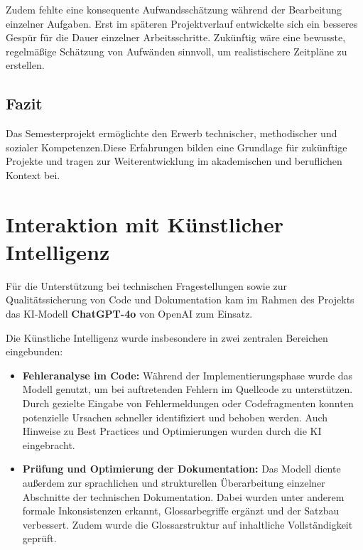 \documentclass[a4paper,12pt]{article}
\begin{document}
Zudem fehlte eine konsequente Aufwandsschätzung während der Bearbeitung einzelner Aufgaben. Erst im späteren Projektverlauf entwickelte sich ein besseres Gespür für die Dauer einzelner Arbeitsschritte. Zukünftig wäre eine bewusste, regelmäßige Schätzung von Aufwänden sinnvoll, um realistischere Zeitpläne zu erstellen.


\subsection{Fazit}

Das Semesterprojekt ermöglichte den Erwerb technischer, methodischer und sozialer Kompetenzen.Diese Erfahrungen bilden eine Grundlage für zukünftige Projekte und tragen zur Weiterentwicklung im akademischen und beruflichen Kontext bei.

\newpage


\section{Interaktion mit Künstlicher Intelligenz}

Für die Unterstützung bei technischen Fragestellungen sowie zur Qualitätssicherung von Code und Dokumentation kam im Rahmen des Projekts das KI-Modell \textbf{ChatGPT-4o} von OpenAI zum Einsatz.

Die Künstliche Intelligenz wurde insbesondere in zwei zentralen Bereichen eingebunden:

\begin{itemize}
  \item \textbf{Fehleranalyse im Code:} Während der Implementierungsphase wurde das Modell genutzt, um bei auftretenden Fehlern im Quellcode zu unterstützen. Durch gezielte Eingabe von Fehlermeldungen oder Codefragmenten konnten potenzielle Ursachen schneller identifiziert und behoben werden. Auch Hinweise zu Best Practices und Optimierungen wurden durch die KI eingebracht.

  \item \textbf{Prüfung und Optimierung der Dokumentation:} Das Modell diente außerdem zur sprachlichen und strukturellen Überarbeitung einzelner Abschnitte der technischen Dokumentation. Dabei wurden unter anderem formale Inkonsistenzen erkannt, Glossarbegriffe ergänzt und der Satzbau verbessert. Zudem wurde die Glossarstruktur auf inhaltliche Vollständigkeit geprüft.

\end{itemize}
\end{document}
